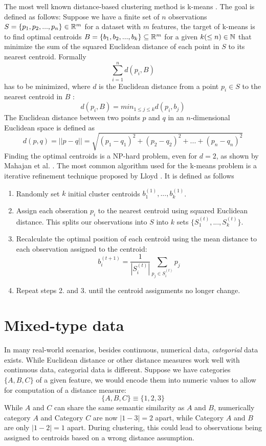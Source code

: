 The most well known distance-based clustering method is k-means \cite{kmeans}. The goal is defined as follows: Suppose we have a finite set of $n$ observations $S=\{p_1, p_2, ..., p_n\} \in \mathbb{R}^m$ for a dataset with $m$ features, the target of k-means is to find optimal centroids $B=\{b_1, b_2, ..., b_k\} \subseteq \mathbb{R}^m$ for a given $k (\leq n) \in \mathbb{N}$ that minimize the sum of the squared Euclidean distance of each point in $S$ to its nearest centroid. Formally
$$\sum_{i=1}^n  d(p_i, B)$$
has to be minimized, where $d$ is the Euclidean distance from a point $p_i \in S$ to the nearest centroid in $B$ \cite{kmeans_np_hard}:
$$d(p_i, B) = min_{1 \leq j \leq k} d(p_i, b_j)$$
The Euclidean distance between two points $p$ and $q$ in an $n$-dimensional Euclidean space is defined as 
$$d(p, q) = || p - q || = \sqrt{(p_1 - q_1)^2 + (p_2 - q_2)^2 + ... + (p_n - q_n)^2}$$
Finding the optimal centroids is a NP-hard problem, even for $d=2$, as shown by Mahajan et al. \cite{kmeans_np_hard}. The most common algorithm used for the k-means problem is a iterative refinement technique proposed by Lloyd \cite{kmeans_lloyd}. It is defined as follows
\begin{enumerate} 
	\item Randomly set $k$ initial cluster centroids $b_1^{(1)}, ..., b_k^{(1)}$.
	\item Assign each obseration $p_i$ to the nearest centroid using squared Euclidean distance. This splits our observations into $S$ into $k$ sets $\{S_1^{(t)}, ..., S_k^{(t)}\}$.
	\item Recalculate the optimal position of each centroid using the mean distance to each observation assigned to the centroid: 
$$b_i^{(t+1)} = \frac{1}{|S_i^{(t)}|} \sum_{p_j \in S_i^{(t)}} p_j$$
	\item Repeat steps 2. and 3. until the centroid assignments no longer change.
\end{enumerate}

\section{Mixed-type data}

In many real-world scenarios, besides continuous, numerical data, \textit{categorial} data exists. While Euclidean distance or other distance measures work well with continuous data, categorial data is different. Suppose we have categories $\{A, B, C\}$ of a given feature, we would encode them into numeric values to allow for computation of a distance measure:
$$\{A, B, C\} \equiv \{1, 2, 3\}$$
While $A$ and $C$ can share the same semantic similarity as $A$ and $B$, numerically category $A$ and Category $C$ are now $|1-3| = 2$ apart, while Category $A$ and $B$ are only $|1-2|=1$ apart. During clustering, this could lead to observations being assigned to centroids based on a wrong distance assumption.

